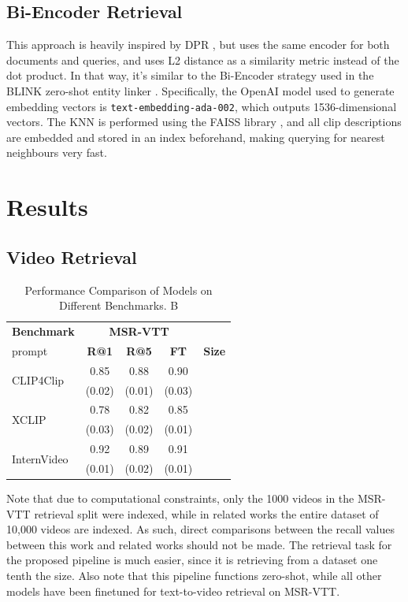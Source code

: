 \documentclass{article}
\begin{document}
\subsection{Bi-Encoder Retrieval}

This approach is heavily inspired by DPR \cite{dpr}, but uses the same encoder for both documents and queries, and uses L2 distance as a similarity metric instead of the dot product.
In that way, it's similar to the Bi-Encoder strategy used in the BLINK zero-shot entity linker \cite{blink}.
Specifically, the OpenAI model used to generate embedding vectors is \verb|text-embedding-ada-002|, which outputs 1536-dimensional vectors.
The KNN is performed using the FAISS library \cite{faiss}, and all clip descriptions are embedded and stored in an index beforehand, making querying for nearest neighbours very fast.

\section{Results}

\subsection{Video Retrieval}

\begin{table}[htbp]
  \centering
  \begin{tabular}{lcccc}
    \toprule
    \textbf{Benchmark} & \multicolumn{3}{c}{\textbf{MSR-VTT}} \\
    \cmidrule(lr){2-4}
                       prompt & \textbf{R@1} & \textbf{R@5} & \textbf{FT} & \textbf{Size} \\
    \midrule
    \multirow{2}{*}{CLIP4Clip} & 0.85 & 0.88 & 0.90 \\
    & (0.02) & (0.01) & (0.03) \\
    \midrule
    \multirow{2}{*}{XCLIP} & 0.78 & 0.82 & 0.85 \\
    & (0.03) & (0.02) & (0.01) \\
    \midrule
    \multirow{2}{*}{InternVideo} & 0.92 & 0.89 & 0.91 \\
    & (0.01) & (0.02) & (0.01) \\
    \bottomrule
  \end{tabular}
  \label{tab:model_comparison}
  \caption{Performance Comparison of Models on Different Benchmarks. B}
\end{table}

Note that due to computational constraints, only the 1000 videos in the MSR-VTT retrieval split were indexed, while in related works the entire dataset of 10,000 videos are indexed.
As such, direct comparisons between the recall values between this work and related works should not be made.
The retrieval task for the proposed pipeline is much easier, since it is retrieving from a dataset one tenth the size.
Also note that this pipeline functions zero-shot, while all other models have been finetuned for text-to-video retrieval on MSR-VTT.
\end{document}
